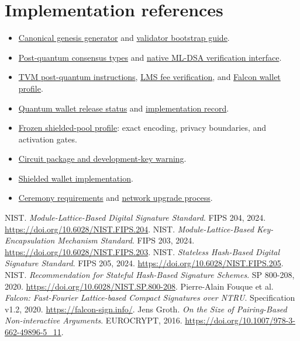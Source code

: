 \documentclass[11pt,a4paper]{article}
\newcommand{\repo}[2]{\href{https://github.com/tosnetwork/tos/blob/main/#1}{#2}}
\begin{document}
\section*{Implementation references}
\begin{itemize}
\item \repo{crypto/smartcont/gen-zerostate.fif}{Canonical genesis generator}
and \repo{doc/validator-genesis-bootstrap.md}{validator bootstrap guide}.
\item \repo{crypto/pq/pq-consensus.h}{Post-quantum consensus types} and
\repo{doc/tvm-mldsa44.md}{native ML-DSA verification interface}.
\item \repo{crypto/vm/pqops.cpp}{TVM post-quantum instructions},
\repo{doc/tvm-lms-fee-hash.md}{LMS fee verification}, and
\repo{doc/wallet-falcon-fndsa.md}{Falcon wallet profile}.
\item \repo{doc/wallet-quantum-release-status.md}{Quantum wallet release status}
and \repo{doc/wallet-quantum-implementation.md}{implementation record}.
\item \repo{artifacts/shielded-pool/PROFILE.md}{Frozen shielded-pool profile}:
exact encoding, privacy boundaries, and activation gates.
\item \repo{tools/shielded-pool-circuit/README.md}{Circuit package and development-key warning}.
\item \href{https://github.com/tosnetwork/tos/tree/main/tools/shielded-pool-wallet}{Shielded wallet implementation}.
\item \repo{artifacts/shielded-pool/CEREMONY.md}{Ceremony requirements} and
\repo{doc/tos-upgrade-process.md}{network upgrade process}.
\end{itemize}
\begin{thebibliography}{9}
 NIST. \emph{Module-Lattice-Based Digital Signature Standard}.
FIPS 204, 2024. \url{https://doi.org/10.6028/NIST.FIPS.204}.
 NIST. \emph{Module-Lattice-Based Key-Encapsulation Mechanism Standard}.
FIPS 203, 2024. \url{https://doi.org/10.6028/NIST.FIPS.203}.
 NIST. \emph{Stateless Hash-Based Digital Signature Standard}.
FIPS 205, 2024. \url{https://doi.org/10.6028/NIST.FIPS.205}.
 NIST. \emph{Recommendation for Stateful Hash-Based Signature
Schemes}. SP 800-208, 2020. \url{https://doi.org/10.6028/NIST.SP.800-208}.
 Pierre-Alain Fouque et al. \emph{Falcon: Fast-Fourier
Lattice-based Compact Signatures over NTRU}. Specification v1.2, 2020.
\url{https://falcon-sign.info/}.
 Jens Groth. \emph{On the Size of Pairing-Based Non-interactive
Arguments}. EUROCRYPT, 2016.
\url{https://doi.org/10.1007/978-3-662-49896-5_11}.
\end{thebibliography}
\end{document}
